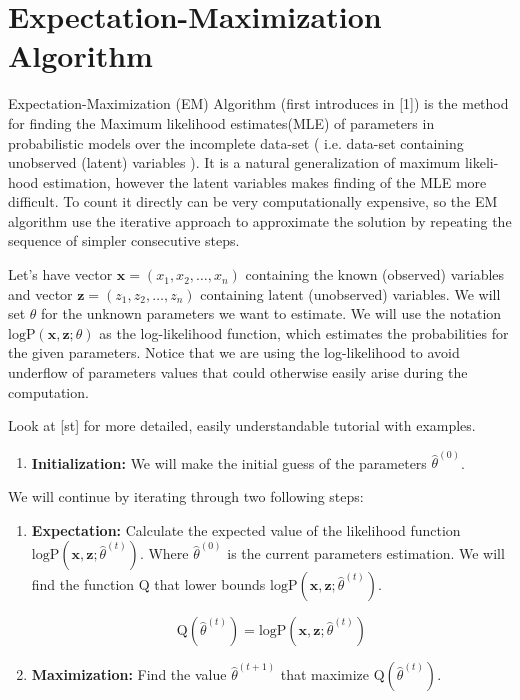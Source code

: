 \documentclass[thesis=M,english]{FITthesis}[2012/10/20]
\begin{document}
\chapter{Expectation-Maximization Algorithm}



Expectation-Maximization (EM) Algorithm (first introduces in [1]) is the method for finding the Maximum likelihood estimates(MLE) of parameters in probabilistic models over the incomplete data-set ( i.e. data-set containing unobserved (latent) variables ). It is a natural generalization of maximum likeli-
hood estimation, however the latent variables makes finding of the MLE more difficult. To count it directly can be very computationally expensive, so the EM algorithm use the iterative approach to approximate the solution by repeating the sequence of simpler consecutive steps.

Let's have vector $\mathbf{x} = (x_{1},x_{2},\dotsc,x_{n})$ containing the known (observed) variables and vector $\mathbf{z} = (z_{1},z_{2},\dotsc,z_{n})$ containing latent (unobserved) variables. We will set $\theta$ for the unknown parameters we want to estimate. We will use the notation $\mathrm{logP}(\mathbf{x},\mathbf{z};\theta)$ as the log-likelihood function, which estimates the probabilities for the given parameters. Notice that we are using the log-likelihood to avoid underflow of parameters values that could otherwise easily arise during the computation.  

Look at [st] for more detailed, easily understandable tutorial with examples.    

\begin{enumerate}
\item \textbf{Initialization:} We will make the initial guess of the parameters $\hat \theta^{(0)} $.
\end{enumerate} 

We will continue by iterating through two following steps: 

\begin{enumerate}[resume]
\item \textbf{Expectation:} Calculate the expected value of the likelihood function $\mathrm{logP}(\mathbf{x},\mathbf{z};\hat \theta^{(t)})$. Where $\hat \theta^{(0)}$ is the current parameters estimation. We will find the function $\mathrm{Q}$ that lower bounds $\mathrm{logP}(\mathbf{x},\mathbf{z};\hat \theta^{(t)})$.

\begin{equation}\label{eq:exp}
 \mathrm{Q}(\hat\theta^{(t)}) =  \mathrm{logP}(\mathbf{x},\mathbf{z};\hat \theta^{(t)})
\end{equation}

\item \textbf{Maximization:} Find the value $\hat\theta^{(t+1)}$ that maximize $\mathrm{Q}(\hat\theta^{(t)})$.  
\end{enumerate}  
\end{document}
